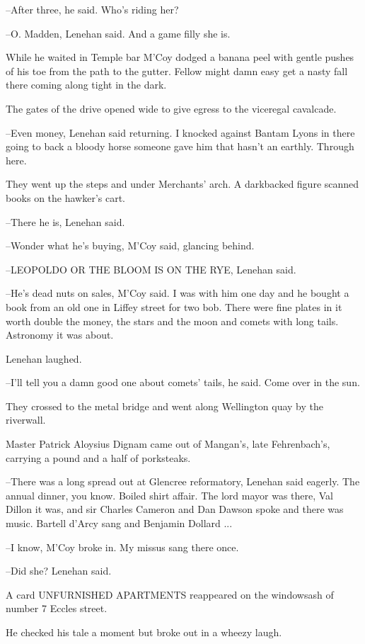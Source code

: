 --After three, he said.
Who's riding her?

--O. Madden, Lenehan said. And a game filly she is.

While he waited in Temple bar M'Coy dodged a banana peel with
gentle pushes of his toe from the path to the gutter. Fellow might damn
easy get a nasty fall there coming along tight in the dark.

The gates of the drive opened wide to give egress to the viceregal
cavalcade.

--Even money, Lenehan said returning. I knocked against Bantam Lyons in
there going to back a bloody horse someone gave him that hasn't an
earthly. Through here.

They went up the steps and under Merchants' arch.
A darkbacked figure scanned books on the hawker's cart.

--There he is, Lenehan said.

--Wonder what he's buying, M'Coy said, glancing behind.

--LEOPOLDO OR THE BLOOM IS ON THE RYE, Lenehan said.

--He's dead nuts on sales, M'Coy said. I was with him one day and he
bought a book from an old one in Liffey street for two bob. There were
fine plates in it worth double the money, the stars and the moon and
comets with long tails. Astronomy it was about.

Lenehan laughed.

--I'll tell you a damn good one about comets' tails, he said.
Come over in the sun.

They crossed to the metal bridge and went along Wellington quay by
the riverwall.

Master Patrick Aloysius Dignam came out of Mangan's, late
Fehrenbach's, carrying a pound and a half of porksteaks.

--There was a long spread out at Glencree reformatory, Lenehan said
eagerly. The annual dinner, you know. Boiled shirt affair. The lord mayor
was there, Val Dillon it was, and sir Charles Cameron and Dan Dawson
spoke and there was music. Bartell d'Arcy sang and Benjamin Dollard ...

--I know, M'Coy broke in.
My missus sang there once.

--Did she? Lenehan said.

A card UNFURNISHED APARTMENTS reappeared on the windowsash of
number 7 Eccles street.

He checked his tale a moment but broke out in a wheezy laugh.

